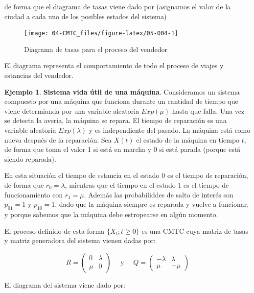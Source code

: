 \documentclass[
]{book}
\theoremstyle{definition}
\theoremstyle{definition}
\newtheorem{example}{Ejemplo}[chapter]
\theoremstyle{definition}
\theoremstyle{definition}
\theoremstyle{remark}
\begin{document}
de forma que el diagrama de tasas viene dado por (asignamos el valor de la ciudad a cada uno de los posibles estados del sistema)

\begin{figure}

{\centering \texttt{[image: 04-CMTC\_files/figure-latex/05-004-1]} 

}

\caption{Diagrama de tasas para el proceso del vendedor}\label{fig:05-004}
\end{figure}

El diagrama representa el comportamiento de todo el proceso de viajes y estancias del vendedor.

\begin{example}
\protect\hypertarget{exm:excmtc005}{}\label{exm:excmtc005}\textbf{Sistema vida útil de una máquina}. Consideramos un sistema compuesto por una máquina que funciona durante un cantidad de tiempo que viene determianda por una variable aleatoria \(Exp(\mu)\) hasta que falla. Una vez se detecta la avería, la máquina se repara. El tiempo de reparación es una variable aleatoria \(Exp(\lambda)\) y es independiente del pasado. La máquina está como nueva después de la reparación. Sea \(X(t)\) el estado de la máquina en tiempo \(t\), de forma que toma el valor 1 si está en marcha y 0 si está parada (porque está siendo reparada).
\end{example}

En esta situación el tiempo de estancia en el estado 0 es el tiempo de reparación, de forma que \(r_0 = \lambda\), mientras que el tiempo en el estado 1 es el tiempo de funcionamiento con \(r_1 = \mu\). Además las probabiliddes de salto de interés son \(p_{01} = 1\) y \(p_{10} = 1\), dado que la máquina siempre es reparada y vuelve a funcionar, y porque sabemos que la máquina debe estropearse en algún momento.

El proceso definido de esta forma \(\{X_t; t \geq 0\}\) es una CMTC cuya matriz de tasas y matriz generadora del sistema vienen dadas por:

\[R = 
\begin{pmatrix}
0 & \lambda \\
\mu & 0
\end{pmatrix} \quad \text{ y } \quad Q = 
\begin{pmatrix}
-\lambda & \lambda \\
\mu & -\mu
\end{pmatrix}\]

El diagrama del sistema viene dado por:
\end{document}
